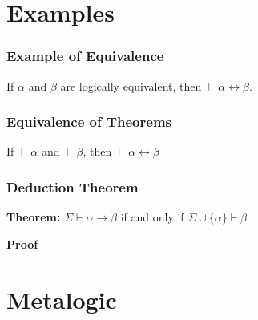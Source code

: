 \documentclass{beamer}
\theoremstyle{indentDefn} \newtheorem{defn}[]{Definition}
\begin{document}
\section{Examples}

\begin{frame}
	\frametitle{Example of Equivalence}	
	
	If $\alpha$ and $\beta$ are logically equivalent, then $\vdash \alpha \leftrightarrow \beta$. 
	
	\vspace{7cm}
	
\end{frame}

\begin{frame}
	\frametitle{Equivalence of Theorems}
	
	If $\vdash \alpha$ and $\vdash \beta$, then $\vdash \alpha \leftrightarrow \beta$
	
	\vspace{7cm}
	
\end{frame}

\begin{frame}
	\frametitle{Deduction Theorem}	
	
	{\bf Theorem:} $\Sigma \vdash \alpha \rightarrow \beta$ if and only if $\Sigma \cup \{\alpha\} \vdash \beta$
	
	\vspace{0.5cm}
	
	{\bf Proof} 
	
	\vspace{5cm}
	
	
	
\end{frame}


\section{Metalogic}
\end{document}
